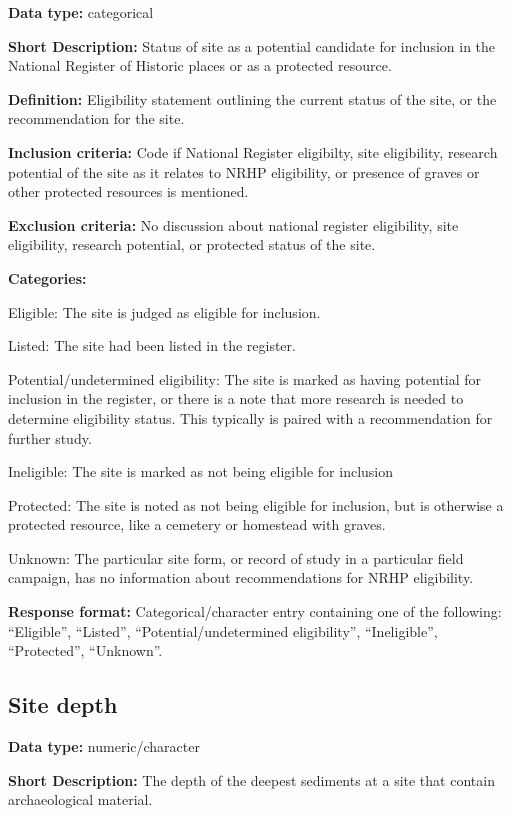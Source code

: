 \documentclass[
]{article}
\begin{document}
\textbf{Data type:} categorical

\textbf{Short Description:} Status of site as a potential candidate for
inclusion in the National Register of Historic places or as a protected
resource.

\textbf{Definition:} Eligibility statement outlining the current status
of the site, or the recommendation for the site.

\textbf{Inclusion criteria:} Code if National Register eligibilty, site
eligibility, research potential of the site as it relates to NRHP
eligibility, or presence of graves or other protected resources is
mentioned.

\textbf{Exclusion criteria:} No discussion about national register
eligibility, site eligibility, research potential, or protected status
of the site.

\textbf{Categories:}

Eligible: The site is judged as eligible for inclusion.

Listed: The site had been listed in the register.

Potential/undetermined eligibility: The site is marked as having
potential for inclusion in the register, or there is a note that more
research is needed to determine eligibility status. This typically is
paired with a recommendation for further study.

Ineligible: The site is marked as not being eligible for inclusion

Protected: The site is noted as not being eligible for inclusion, but is
otherwise a protected resource, like a cemetery or homestead with
graves.

Unknown: The particular site form, or record of study in a particular
field campaign, has no information about recommendations for NRHP
eligibility.

\textbf{Response format:} Categorical/character entry containing one of
the following: ``Eligible'', ``Listed'', ``Potential/undetermined
eligibility'', ``Ineligible'', ``Protected'', ``Unknown''.

\subsection{Site depth}\label{site-depth}

\textbf{Data type:} numeric/character

\textbf{Short Description:} The depth of the deepest sediments at a site
that contain archaeological material.
\end{document}
